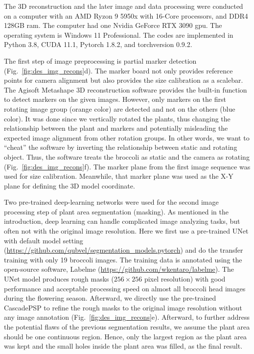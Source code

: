 The 3D reconstruction and the later image and data processing were conducted on a computer with an AMD Ryzon 9 5950x with 16-Core processors, and DDR4 128GB \gls{ram}. The computer had one Nvidia GeForce RTX 3090 \gls{gpu}. The operating system is Windows 11 Professional. The codes are implemented in Python 3.8, CUDA 11.1, Pytorch 1.8.2, and torchversion 0.9.2.

The first step of image preprocessing is partial marker detection (Fig.~\ref{fig:des_img_recons}d). The marker board not only provides reference points for camera alignment but also provides the size calibration as a scalebar. The Agisoft Metashape 3D reconstruction software provides the built-in function to detect markers on the given images. However, only markers on the first rotating image group (orange color) are detected and not on the others (blue color). It was done since we vertically rotated the plants, thus changing the relationship between the plant and markers and potentially misleading the expected image alignment from other rotation groups. In other words, we want to ``cheat'' the software by inverting the relationship between static and rotating object. Thus, the software treats the broccoli as static and the camera as rotating (Fig.~\ref{fig:des_img_recons}f). The marker plane from the first image sequence was used for size calibration. Meanwhile, that marker plane was used as the X-Y plane for defining the 3D model coordinate.

Two pre-trained deep-learning networks were used for the second image processing step of plant area segmentation (masking). As mentioned in the introduction, deep learning can handle complicated image analyzing tasks, but often not with the original image resolution. Here we first use a pre-trained UNet with default model setting (\url{https://github.com/qubvel/segmentation_models.pytorch}) and do the transfer training with only 19 broccoli images. The training data is annotated using the open-source software, Labelme (\url{https://github.com/wkentaro/labelme}). The UNet model produces rough masks ($256 \times 256$ pixel resolution) with good performance and acceptable processing speed on almost all broccoli head images during the flowering season. Afterward, we directly use the pre-trained CascadePSP \citep[\url{https://github.com/hkchengrex/CascadePSP}]{cheng_cascadepsp_2020} to refine the rough masks to the original image resolution without any image annotation (Fig.~\ref{fig:des_img_recons}e). Afterward, to further address the potential flaws of the previous segmentation results, we assume the plant area should be one continuous region. Hence, only the largest region as the plant area was kept and the small holes inside the plant area was filled, as the final result.


